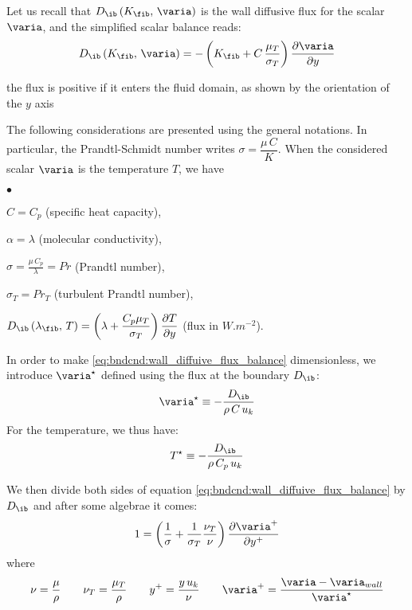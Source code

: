  Let us recall that $D_\ib \left( K_\fib , \, \varia \right) $ is the wall diffusive flux for the scalar $\varia$, 
 and the simplified scalar balance reads:
\begin{equation}\label{eq:bndcnd:wall_diffuive_flux_balance}
D_\ib \left( K_\fib , \, \varia \right)  = 
-\left(K_\fib + C\,\frac{\mu_T}{\sigma_T}\right)
                  \dfrac{\partial \varia}{\partial y}
\end{equation}

\begin{remark}
the flux is positive 
if it enters the fluid domain, as shown by the orientation of the 
$y$ axis
\end{remark}

The following considerations are presented using the general notations.
In particular, the Prandtl-Schmidt number writes 
$\sigma=\displaystyle\dfrac{\mu \,C}{K}$.
When the considered scalar $\varia$ is the temperature $T$, 
we have
\begin{list}{$\bullet$}{}
\item $C=C_p$ (specific heat capacity),
\item $\alpha=\lambda$ (molecular conductivity),
\item $\sigma = \displaystyle\frac{\mu \,C_p}{\lambda} = Pr$
       (Prandtl number),
\item $\sigma_T = Pr_T$ (turbulent Prandtl number),
\item $D_\ib \left( \lambda_\fib , \, T \right) =\left(\lambda+\displaystyle\frac{C_p \mu_T}{\sigma_T}\right)
        \displaystyle \dfrac{\partial T}{\partial y}$ (flux in $W.m^{-2}$).
\end{list}


In order to make \eqref{eq:bndcnd:wall_diffuive_flux_balance} dimensionless, 
we introduce $\varia^\star$ defined using
the flux at the boundary  $D_\ib$:
\begin{equation}\label{eq:bndcnd:def_varia_star}
\varia^\star \equiv -\displaystyle \dfrac{D_\ib}{\rho\,C\,u_k}
\end{equation}
For the temperature, we thus have:
\begin{equation}\label{eq:bndcnd:def_T_star}
T^\star \equiv -\displaystyle\frac{D_\ib}{\rho\,C_p\,u_k}
\end{equation}

We then divide both sides of equation \eqref{eq:bndcnd:wall_diffuive_flux_balance}
by  $D_\ib$ and after some algebrae it comes:
\begin{equation}\label{eq:bndcnd:scalar_flux_adim}
1 =  \left(\displaystyle\frac{1}{\sigma}+
              \displaystyle\frac{1}{\sigma_T}\dfrac{\nu_T}{\nu}\right)
                  \displaystyle\dfrac{\partial \varia^+}{\partial y^+}
\end{equation}
%
where
\begin{equation}
       \nu=\displaystyle \dfrac{\mu}{\rho}
\qquad \nu_T=\displaystyle\dfrac{\mu_T}{\rho}
\qquad y^+=\displaystyle\dfrac{y\,u_k}{\nu}
\qquad \varia^+=\displaystyle \dfrac{\varia-\varia_{wall}}{\varia^\star}
\end{equation}

